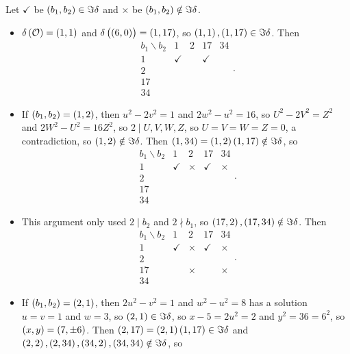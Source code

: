 \begin{example}
\begin{itemize}
\pagebreak

Let $ \checkmark $ be $ \br{b_1, b_2} \in \Im \delta $ and $ \times $ be $ \br{b_1, b_2} \notin \Im \delta $.
\begin{itemize}
\item $ \delta\br{\OOO} = \br{1, 1} $ and $ \delta\br{\br{6, 0}} = \br{1, 17} $, so $ \br{1, 1}, \br{1, 17} \in \Im \delta $. Then
$$
\begin{array}{c|cccc}
b_1 \backslash b_2 & 1 & 2 & 17 & 34 \\
\hline
1 & \checkmark & & \checkmark & \\
2 & & & & \\
17 & & & & \\
34 & & & &
\end{array}.
$$
\item If $ \br{b_1, b_2} = \br{1, 2} $, then $ u^2 - 2v^2 = 1 $ and $ 2w^2 - u^2 = 16 $, so $ U^2 - 2V^2 = Z^2 $ and $ 2W^2 - U^2 = 16Z^2 $, so $ 2 \mid U, V, W, Z $, so $ U = V = W = Z = 0 $, a contradiction, so $ \br{1, 2} \notin \Im \delta $. Then $ \br{1, 34} = \br{1, 2}\br{1, 17} \notin \Im \delta $, so
$$
\begin{array}{c|cccc}
b_1 \backslash b_2 & 1 & 2 & 17 & 34 \\
\hline
1 & \checkmark & \times & \checkmark & \times \\
2 & & & & \\
17 & & & & \\
34 & & & &
\end{array}.
$$
\item This argument only used $ 2 \mid b_2 $ and $ 2 \nmid b_1 $, so $ \br{17, 2}, \br{17, 34} \notin \Im \delta $. Then
$$
\begin{array}{c|cccc}
b_1 \backslash b_2 & 1 & 2 & 17 & 34 \\
\hline
1 & \checkmark & \times & \checkmark & \times \\
2 & & & & \\
17 & & \times & & \times \\
34 & & & &
\end{array}.
$$
\item If $ \br{b_1, b_2} = \br{2, 1} $, then $ 2u^2 - v^2 = 1 $ and $ w^2 - u^2 = 8 $ has a solution $ u = v = 1 $ and $ w = 3 $, so $ \br{2, 1} \in \Im \delta $, so $ x - 5 = 2u^2 = 2 $ and $ y^2 = 36 = 6^2 $, so $ \br{x, y} = \br{7, \pm 6} $. Then $ \br{2, 17} = \br{2, 1}\br{1, 17} \in \Im \delta $ and $ \br{2, 2}, \br{2, 34}, \br{34, 2}, \br{34, 34} \notin \Im \delta $, so
$$
\begin{array}{c|cccc}

\end{array}$$
\end{itemize}
\end{itemize}
\end{example}
